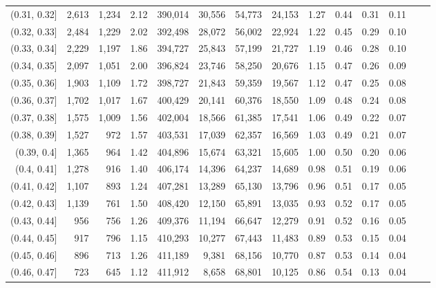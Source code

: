 \begin{tabular}{rrrrrrrrrrrrrr}
(0.31, 0.32]   &   2,613 &  1,234 &   2.12 &  390,014 &   30,556 &  54,773 &  24,153 &  1.27 &  0.44 &  0.31 &      0.11 \\
(0.32, 0.33]   &   2,484 &  1,229 &   2.02 &  392,498 &   28,072 &  56,002 &  22,924 &  1.22 &  0.45 &  0.29 &      0.10 \\
(0.33, 0.34]   &   2,229 &  1,197 &   1.86 &  394,727 &   25,843 &  57,199 &  21,727 &  1.19 &  0.46 &  0.28 &      0.10 \\
(0.34, 0.35]   &   2,097 &  1,051 &   2.00 &  396,824 &   23,746 &  58,250 &  20,676 &  1.15 &  0.47 &  0.26 &      0.09 \\
(0.35, 0.36]   &   1,903 &  1,109 &   1.72 &  398,727 &   21,843 &  59,359 &  19,567 &  1.12 &  0.47 &  0.25 &      0.08 \\
(0.36, 0.37]   &   1,702 &  1,017 &   1.67 &  400,429 &   20,141 &  60,376 &  18,550 &  1.09 &  0.48 &  0.24 &      0.08 \\
(0.37, 0.38]   &   1,575 &  1,009 &   1.56 &  402,004 &   18,566 &  61,385 &  17,541 &  1.06 &  0.49 &  0.22 &      0.07 \\
(0.38, 0.39]   &   1,527 &    972 &   1.57 &  403,531 &   17,039 &  62,357 &  16,569 &  1.03 &  0.49 &  0.21 &      0.07 \\
(0.39, 0.4]    &   1,365 &    964 &   1.42 &  404,896 &   15,674 &  63,321 &  15,605 &  1.00 &  0.50 &  0.20 &      0.06 \\
(0.4, 0.41]    &   1,278 &    916 &   1.40 &  406,174 &   14,396 &  64,237 &  14,689 &  0.98 &  0.51 &  0.19 &      0.06 \\
(0.41, 0.42]   &   1,107 &    893 &   1.24 &  407,281 &   13,289 &  65,130 &  13,796 &  0.96 &  0.51 &  0.17 &      0.05 \\
(0.42, 0.43]   &   1,139 &    761 &   1.50 &  408,420 &   12,150 &  65,891 &  13,035 &  0.93 &  0.52 &  0.17 &      0.05 \\
(0.43, 0.44]   &     956 &    756 &   1.26 &  409,376 &   11,194 &  66,647 &  12,279 &  0.91 &  0.52 &  0.16 &      0.05 \\
(0.44, 0.45]   &     917 &    796 &   1.15 &  410,293 &   10,277 &  67,443 &  11,483 &  0.89 &  0.53 &  0.15 &      0.04 \\
(0.45, 0.46]   &     896 &    713 &   1.26 &  411,189 &    9,381 &  68,156 &  10,770 &  0.87 &  0.53 &  0.14 &      0.04 \\
(0.46, 0.47]   &     723 &    645 &   1.12 &  411,912 &    8,658 &  68,801 &  10,125 &  0.86 &  0.54 &  0.13 &      0.04 \\

\end{tabular}
